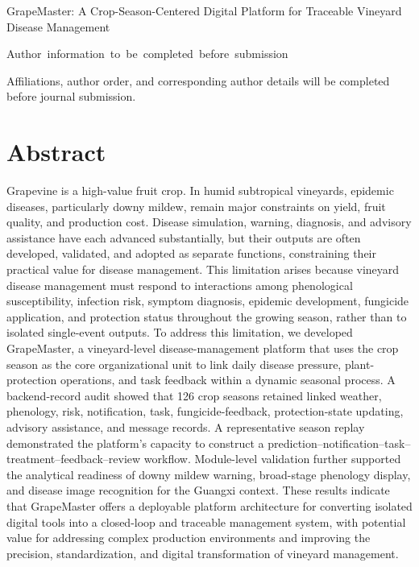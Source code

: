 \documentclass[12pt]{article}
\newcommand{\manuscripttitle}{GrapeMaster: A Crop-Season-Centered Digital Platform for Traceable Vineyard Disease Management}
\begin{document}
\linenumbers

\begin{center}
{\LARGE{}\selectfont \manuscripttitle\par}
\end{center}

\vspace{0.8em}

\begingroup
\normalsize
{}
\noindent
\mbox{Author~information~to~be~completed~before~submission}
\par
\vspace{0.7em}

\noindent
Affiliations, author order, and corresponding author details will be completed before journal submission.
\par
\endgroup

\vspace{1em}

\section*{Abstract}

Grapevine is a high-value fruit crop. In humid subtropical vineyards, epidemic diseases, particularly downy mildew, remain major constraints on yield, fruit quality, and production cost. Disease simulation, warning, diagnosis, and advisory assistance have each advanced substantially, but their outputs are often developed, validated, and adopted as separate functions, constraining their practical value for disease management. This limitation arises because vineyard disease management must respond to interactions among phenological susceptibility, infection risk, symptom diagnosis, epidemic development, fungicide application, and protection status throughout the growing season, rather than to isolated single-event outputs. To address this limitation, we developed GrapeMaster, a vineyard-level disease-management platform that uses the crop season as the core organizational unit to link daily disease pressure, plant-protection operations, and task feedback within a dynamic seasonal process. A backend-record audit showed that 126 crop seasons retained linked weather, phenology, risk, notification, task, fungicide-feedback, protection-state updating, advisory assistance, and message records. A representative season replay demonstrated the platform's capacity to construct a prediction--notification--task--treatment--feedback--review workflow. Module-level validation further supported the analytical readiness of downy mildew warning, broad-stage phenology display, and disease image recognition for the Guangxi context. These results indicate that GrapeMaster offers a deployable platform architecture for converting isolated digital tools into a closed-loop and traceable management system, with potential value for addressing complex production environments and improving the precision, standardization, and digital transformation of vineyard management.
\end{document}
